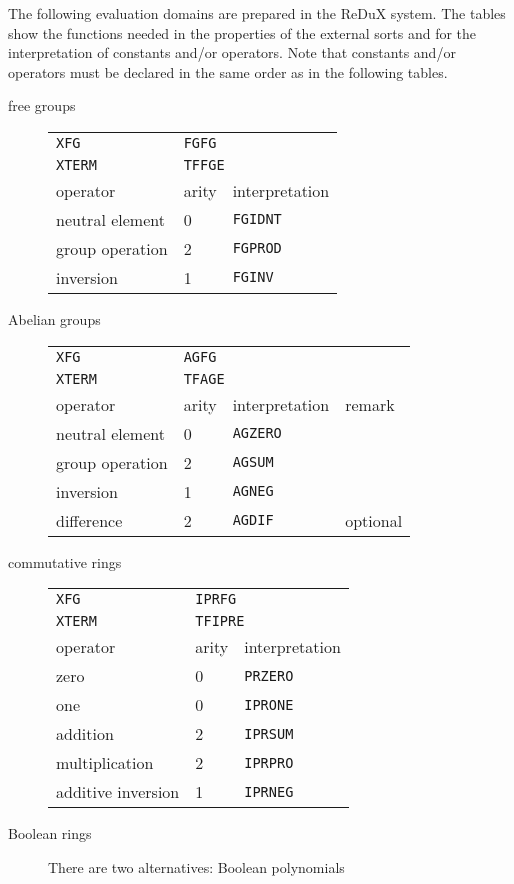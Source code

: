 The following evaluation domains are prepared in the ReDuX system.
The tables show the functions needed in the properties of the external sorts
and for the interpretation of constants and/or operators.
Note that constants and/or operators must be declared in the same 
order as in the following tables.
\begin{description}
\item[free groups] \null

\begin{tabular}[t]{l|l|l}
\hline
\texttt{XFG} & \multicolumn{2}{l}{\texttt{FGFG}} \\
\texttt{XTERM} & \multicolumn{2}{l}{\texttt{TFFGE}} \\
\hline
\hline
operator & arity & interpretation \\
\hline
neutral element & 0 & \texttt{FGIDNT} \\
group operation & 2 & \texttt{FGPROD} \\
inversion & 1 & \texttt{FGINV}\\
\hline
\end{tabular}
\item[Abelian groups]  \null

\begin{tabular}[t]{l|l|l|l}
\hline
\texttt{XFG} & \multicolumn{3}{l}{\texttt{AGFG}} \\
\texttt{XTERM} & \multicolumn{3}{l}{\texttt{TFAGE}} \\
\hline
\hline
operator & arity & interpretation & remark \\
\hline
neutral element & 0 & \texttt{AGZERO} \\
group operation & 2 & \texttt{AGSUM} \\
inversion & 1 & \texttt{AGNEG}\\
difference & 2 & \texttt{AGDIF} & optional \\
\hline
\end{tabular}
\item[commutative rings] \null

\begin{tabular}[t]{l|l|l}
\hline
\texttt{XFG} & \multicolumn{2}{l}{\texttt{IPRFG}} \\
\texttt{XTERM} & \multicolumn{2}{l}{\texttt{TFIPRE}} \\
\hline
\hline
operator & arity & interpretation \\
\hline
zero & 0 & \texttt{PRZERO} \\
one & 0 & \texttt{IPRONE} \\
addition & 2 & \texttt{IPRSUM} \\
multiplication & 2 & \texttt{IPRPRO} \\
additive inversion & 1 & \texttt{IPRNEG} \\
\hline
\end{tabular}
\item[Boolean rings] There are two alternatives: Boolean polynomials 


\end{description}
